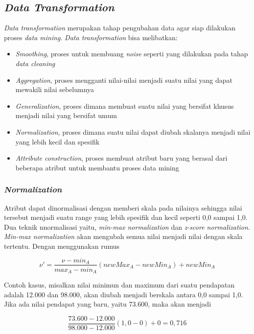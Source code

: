 \subsection{\textsl{Data Transformation}}
\textsl{Data transformation} merupakan tahap pengubahan data agar siap dilakukan proses \textsl{data mining}. \textsl{Data transformation} bisa melibatkan:
	\begin{itemize}
		\item \textsl{Smoothing}, proses untuk membuang \textsl{noise} seperti yang dilakukan pada tahap \textsl{data cleaning}
		\item \textsl{Aggregation}, proses mengganti nilai-nilai menjadi suatu nilai yang dapat mewakili nilai sebelumnya
		\item \textsl{Generalization}, proses dimana membuat suatu nilai yang bersifat khusus menjadi nilai yang bersifat umum
		\item \textsl{Normalization}, proses dimana suatu nilai dapat diubah skalanya menjadi nilai yang lebih kecil dan spesifik
		\item \textsl{Attribute construction}, proses membuat atribut baru yang berasal dari beberapa atribut untuk membantu proses data mining
	\end{itemize}
	
\subsubsection{\textsl{Normalization}}
Atribut dapat dinormalisasi dengan memberi skala pada nilainya sehingga nilai tersebut menjadi suatu range yang lebih spesifik dan kecil seperti 0,0 sampai 1,0.
Dua teknik nnormalisasi yaitu, \textsl{min-max normalization} dan \textsl{z-score normalization}. \textsl{Min-max normalization} akan mengubah semua nilai menjadi nilai dengan skala tertentu. Dengan menggunakan rumus 

\begin{displaymath}
	\nu' = \frac{\nu-min_{A}}{max_{A}-min_{A}}(newMax_{A}-newMin_{A})+newMin_{A}	
\end{displaymath}

Contoh kasus, misalkan nilai minimun dan maximum dari suatu pendapatan adalah 12.000 dan 98.000, akan diubah menjadi berskala antara 0,0 sampai 1,0. Jika ada nilai pendapat yang baru, yaitu 73.600, maka akan menjadi

\begin{displaymath}
\frac{73.600-12.000}{98.000-12.000} (1,0-0)+0 = 0,716
\end{displaymath}


